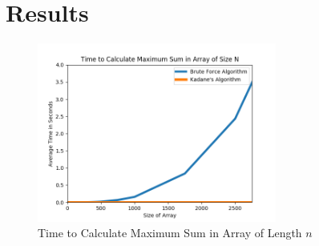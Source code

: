 \documentclass[10pt, letterpaper]{article}
\begin{document}
	\section{Results}



	\begin{figure}[htbp]
		\begin{center}
			\includegraphics[width=0.70\textwidth]{python/avgTimeGraph.png}
			\caption{Time to Calculate Maximum Sum in Array of Length $n$}
			\label{fig:time-graph}
		\end{center}
	\end{figure}
\end{document}
